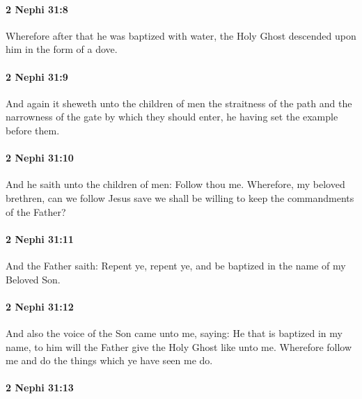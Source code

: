 		\paragraph{2 Nephi 31:8} %
			\label{2NEPHI-31-8}

			Wherefore after that he was baptized with water,
			the Holy Ghost descended upon him in the form of a dove.

		\paragraph{2 Nephi 31:9} %
			\label{2NEPHI-31-9}

			And again it sheweth unto the children of men
			the straitness of the path and the narrowness of the gate
			by which they should enter,
			he having set the example before them.

		\paragraph{2 Nephi 31:10} %
			\label{2NEPHI-31-10}

			And he saith unto the children of men:
			Follow thou me.
			Wherefore, my beloved brethren, can we follow Jesus
			save we shall be willing to keep the commandments of the Father?

		\paragraph{2 Nephi 31:11} %
			\label{2NEPHI-31-11}

			And the Father saith:
			Repent ye, repent ye, and be baptized in the name of my Beloved Son.

		\paragraph{2 Nephi 31:12} %
			\label{2NEPHI-31-12}

			And also the voice of the Son came unto me, saying:
			He that is baptized in my name,
			to him will the Father give the Holy Ghost like unto me.
			Wherefore follow me and do the things which ye have seen me do.

		\paragraph{2 Nephi 31:13} %
			\label{2NEPHI-31-13}

